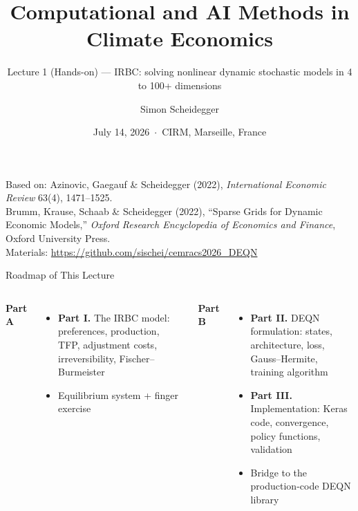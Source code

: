 \documentclass[aspectratio=169,11pt]{beamer}
\title[CEMRACS 2026 $\cdot$ IRBC]
{Computational and AI Methods in Climate Economics}
\subtitle{Lecture 1 (Hands-on) --- IRBC: solving nonlinear dynamic stochastic models in 4 to 100+ dimensions}
\author{Simon Scheidegger}
\institute[HEC Lausanne]{HEC Lausanne $\cdot$ Grantham Research Institute, LSE}
\date{July 14, 2026 \,$\cdot$\, CIRM, Marseille, France}
\begin{document}
\newcommand{\exercisepause}{%
  \tikz[baseline=(X.base)]{\node[fill=darkgreen!80!black, text=white,
  rounded corners=2pt, inner sep=3pt, font=\scriptsize\bfseries](X){PAUSE --- 5 min};}}



{
\begin{frame}
\titlepage
\vspace{-0.4cm}
\begin{center}
{\footnotesize Based on: Azinovic, Gaegauf \& Scheidegger (2022), \emph{International Economic Review} 63(4), 1471--1525.\\
Brumm, Krause, Schaab \& Scheidegger (2022), ``Sparse Grids for Dynamic Economic Models,'' \emph{Oxford Research Encyclopedia of Economics and Finance}, Oxford University Press.}\\[4pt]
{\footnotesize Materials: \url{https://github.com/sischei/cemracs2026_DEQN}}
\end{center}
\end{frame}
}

\begin{frame}{Roadmap of This Lecture}
\vspace{0.2em}
\begin{columns}[T]
\textbf{Part A}
\begin{itemize}
    \item \textbf{Part I.} The IRBC model: preferences, production, TFP, adjustment costs, irreversibility, Fischer--Burmeister
    \item Equilibrium system + finger exercise
\end{itemize}

\textbf{Part B}
\begin{itemize}
    \item \textbf{Part II.} DEQN formulation: states, architecture, loss, Gauss--Hermite, training algorithm
    \item \textbf{Part III.} Implementation: Keras code, convergence, policy functions, validation
    \item Bridge to the production-code DEQN library
\end{itemize}
\end{columns}
\end{frame}
\end{document}
